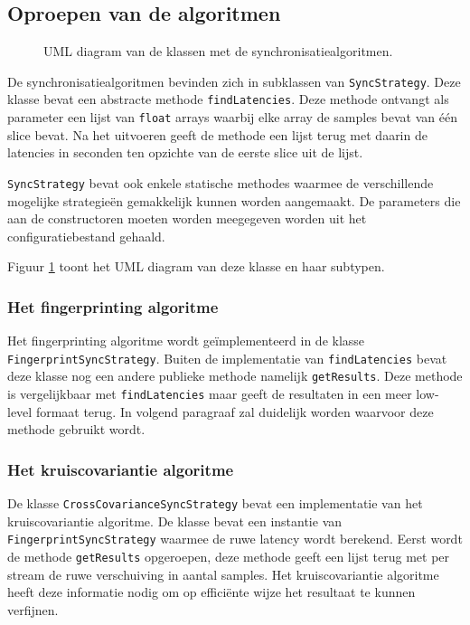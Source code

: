 \subsection{Oproepen van de algoritmen}

\begin{figure}[h!]
	\captionsetup{width=0.7\textwidth}
	\caption{UML diagram van de klassen met de synchronisatiealgoritmen.}
	\begin{center}
		\advance\parskip0.3cm
		
	\end{center}
	\label{SyncStrategyUML}
\end{figure}

De synchronisatiealgoritmen bevinden zich in subklassen van \texttt{SyncStrategy}. Deze klasse bevat een abstracte methode \texttt{findLatencies}. Deze methode ontvangt als parameter een lijst van \texttt{float} arrays waarbij elke array de samples bevat van één slice bevat. Na het uitvoeren geeft de methode een lijst terug met daarin de latencies in seconden ten opzichte van de eerste slice uit de lijst.

\texttt{SyncStrategy} bevat ook enkele statische methodes waarmee de verschillende mogelijke strategieën gemakkelijk kunnen worden aangemaakt. De parameters die aan de constructoren moeten worden meegegeven worden uit het configuratiebestand gehaald.

Figuur \ref{SyncStrategyUML} toont het UML diagram van deze klasse en haar subtypen. 

\subsubsection{Het fingerprinting algoritme}
Het fingerprinting algoritme wordt geïmplementeerd in de klasse \texttt{FingerprintSyncStrategy}. Buiten de implementatie van \texttt{findLatencies} bevat deze klasse nog een andere publieke methode namelijk \texttt{getResults}. Deze methode is vergelijkbaar met \texttt{findLatencies} maar geeft de resultaten in een meer low-level formaat terug. In volgend paragraaf zal duidelijk worden waarvoor deze methode gebruikt wordt.

\subsubsection{Het kruiscovariantie algoritme}
De klasse \texttt{CrossCovarianceSyncStrategy} bevat een implementatie van het kruiscovariantie algoritme. De klasse bevat een instantie van \texttt{FingerprintSyncStrategy} waarmee de ruwe latency wordt berekend. Eerst wordt de methode \texttt{getResults} opgeroepen, deze methode geeft een lijst terug met per stream de ruwe verschuiving in aantal samples. Het kruiscovariantie algoritme heeft deze informatie nodig om op efficiënte wijze het resultaat te kunnen verfijnen.

